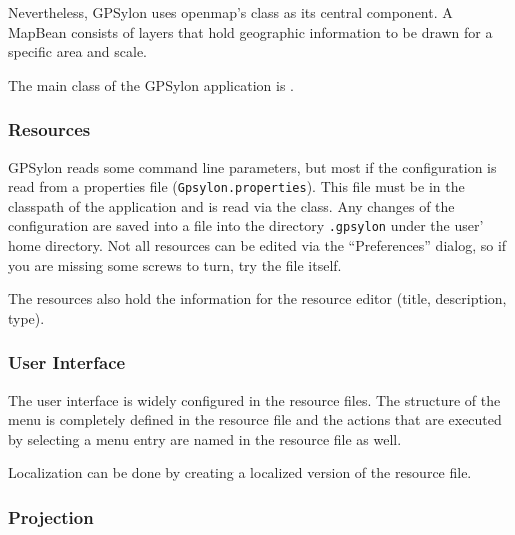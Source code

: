 \documentclass[a4paper]{article} %
\begin{document}
Nevertheless, GPSylon uses openmap's  class as its
central component. A MapBean consists of layers that hold geographic
information to be drawn for a specific area and scale. 

The main class of the GPSylon application is
.

\subsubsection{Resources}
\label{SoftwareDesignOfTheGpstoolPackage-Resources}

GPSylon reads some command line parameters, but most if the
configuration is read from a properties file
(\texttt{Gpsylon.properties}). This file must be in the classpath of
the application and is read via the
 class. Any changes of the
configuration are saved into a file into the directory
\texttt{.gpsylon} under the user' home directory. Not all resources can
be edited via the ``Preferences'' dialog, so if you are missing some
screws to turn, try the file itself.

The resources also hold the information for the resource editor
(title, description, type).


\subsubsection{User Interface}
\label{SoftwareDesignOfTheGpstoolPackage-UserInterface}

The user interface is widely configured in the resource files. The
structure of the menu is completely defined in the resource file and
the actions that are executed by selecting a menu entry are named in
the resource file as well.

Localization can be done by creating a localized version of the
resource file.

\subsubsection{Projection}
\label{SoftwareDesignOfTheGpstoolPackage-Projection}
\end{document}
